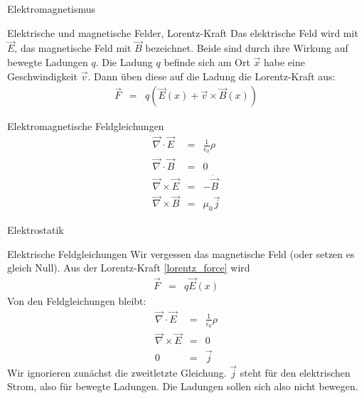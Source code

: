 \def\titlestr{Elektromagnetismus}
\ifx\makebook\undefined
	
\else
	\begin{chapter}{\titlestr}
\fi
\begin{section}{Elektrische und magnetische Felder, Lorentz-Kraft}
Das elektrische Feld wird mit $\vec{E}$, das magnetische Feld mit $\vec{B}$ bezeichnet. Beide sind durch ihre Wirkung auf bewegte Ladungen $q$. Die Ladung $q$ befinde sich am Ort $\vec{x}$ habe eine Geschwindigkeit $\vec{v}$.
Dann üben diese auf die Ladung die Lorentz-Kraft aus:
\begin{eqnarray}
\label{lorentz_force}
\vec{F} &=& q\left(\vec{E}(x)+\vec{v}\times\vec{B}(x)\right)
\end{eqnarray}
\end{section}

\begin{section}{Elektromagnetische Feldgleichungen}
\label{incomlete_eqns}
\begin{eqnarray}
\label{coulomb-eqn}
\vec{\nabla}\cdot\vec{E} &=& \frac{1}{\epsilon_0}\rho\\
\label{no_magnetic_source_eqn}
\vec{\nabla}\cdot\vec{B} &=& 0\\
\label{faraday_induction_eqn}
\vec{\nabla}\times\vec{E} &=& -\dot{\vec{B}}\\
\label{ampere_current_makes_magnetic_field}
\vec{\nabla}\times\vec{B} &=& \mu_0\vec{j}
\end{eqnarray}
\end{section}

\begin{section}{Elektrostatik}
\begin{subsection}{Elektrische Feldgleichungen}
Wir vergessen das magnetische Feld (oder setzen es gleich Null).
Aus der Lorentz-Kraft \ref{lorentz_force} wird
\begin{eqnarray*}
\vec{F} &=& q\vec{E}(x)
\end{eqnarray*}
Von den Feldgleichungen bleibt:
\begin{eqnarray*}
\vec{\nabla}\cdot\vec{E} &=& \frac{1}{\epsilon_0}\rho\\
\vec{\nabla}\times\vec{E} &=& 0\\
0 &=& \vec{j}
\end{eqnarray*}
Wir ignorieren zunächst die zweitletzte Gleichung. $\vec{j}$ steht für den elektrischen Strom, also für bewegte Ladungen. Die Ladungen sollen sich also nicht bewegen.
\end{subsection}


\end{section}
\end{chapter}

